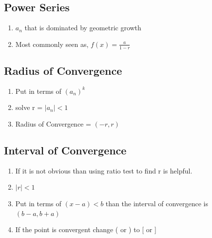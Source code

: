 \documentclass[12pt]{article}
\begin{document}
\subsection{Power Series}

\begin{enumerate}
\item $a_n$ that is dominated by geometric growth
\item Most commonly seen as, $f(x) = \frac{a}{1-r}$
\end{enumerate}


\subsection{Radius of Convergence}

\begin{enumerate}
\item Put in terms of $( a_n )^{k}$
\item solve r = $|a_n| < 1$
\item Radius of Convergence = $(-r, r)$
\end{enumerate}


\subsection{Interval of Convergence}

\begin{enumerate}
\item If it is not obvious than using ratio test to find r is helpful.
\item $|r| < 1$
\item Put in terms of $(x - a) < b$ than the interval of convergence is $(b-a, b+a)$
\item If the point is convergent change ( or ) to [ or ]
\end{enumerate}
\end{document}
